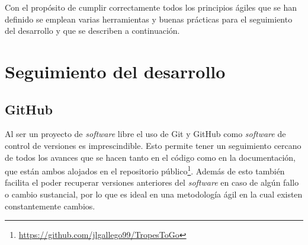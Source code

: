 Con el propósito de cumplir correctamente todos los principios ágiles que se han
definido se emplean varias herramientas y buenas prácticas para el seguimiento
del desarrollo y que se describen a continuación.

\section{Seguimiento del desarrollo}
\subsection{GitHub}
Al ser un proyecto de \textit{software} libre el uso de Git y GitHub como
\textit{software} de control de versiones es imprescindible. Esto permite tener
un seguimiento cercano de todos los avances que se hacen tanto en el código como
en la documentación, que están ambos alojados en el repositorio
público\footnote{\url{https://github.com/jlgallego99/TropesToGo}}. Además de
esto también facilita el poder recuperar versiones anteriores del
\textit{software} en caso de algún fallo o cambio sustancial, por lo que es
ideal en una metodología ágil en la cual existen constantemente cambios.

